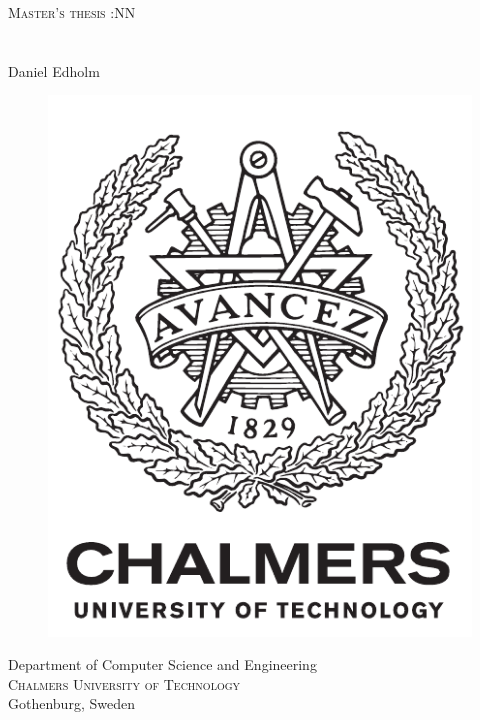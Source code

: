\newpage
\thispagestyle{empty}
\begin{center}
	\textsc{\large Master's thesis \the\year:NN}\\[4cm]
	\textbf{\Large \THETITLE} \\[1cm]
	{\large \TITLEDESCR}\\[1cm]
	{\large Daniel Edholm}
	
	\vfill	
	\begin{figure}[h!]
	\centering
	\includegraphics[width=0.2\pdfpagewidth]{figure/auxiliary/logo_eng.pdf} \\	
	\end{figure}	\vspace{5mm}	
	
	Department of Computer Science and Engineering \\
	\textsc{Chalmers University of Technology} \\
	Gothenburg, Sweden \the\year \\
\end{center}


